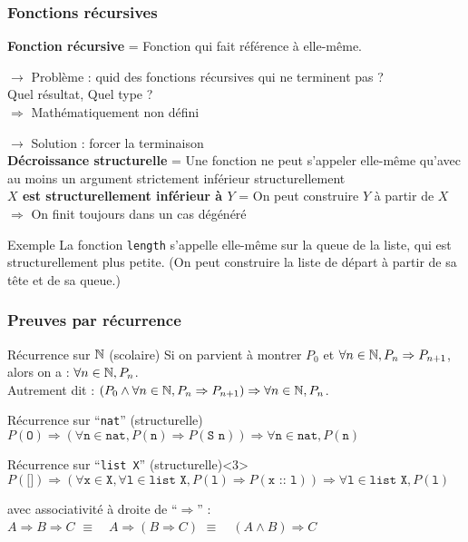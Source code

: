 \documentclass[9pt]{beamer}
\newenvironment{ex}[1][Exemple]{\begin{exampleblock}{#1}}{\end{exampleblock}}
\newenvironment{code}[1][Code]{\begin{block}{#1}}{\end{block}}
\newcommand{\defi}[1]{\textbf{#1}}
\begin{document}
\begin{frame}
\frametitle{Fonctions récursives}

\defi{Fonction récursive} = Fonction qui fait référence à elle-même.

\medskip
$\rightarrow$ Problème : quid des fonctions récursives qui ne terminent pas ?\\
Quel résultat, Quel type ?\\
\quad$\Rightarrow$ Mathématiquement non défini

\pause
\medskip
$\rightarrow$ Solution : forcer la terminaison\\
\defi{Décroissance structurelle} = Une fonction ne peut s'appeler elle-même qu'avec au moins un argument strictement inférieur structurellement\\
\defi{$X$ est structurellement inférieur à $Y$} = On peut construire $Y$ à partir de $X$\\
\quad$\Rightarrow$ On finit toujours dans un cas dégénéré

\pause
\begin{ex}
La fonction \texttt{length} s'appelle elle-même sur la queue de la liste, qui est structurellement plus petite. (On peut construire la liste de départ à partir de sa tête et de sa queue.)
\end{ex}


\end{frame}



\begin{frame}
\frametitle{Preuves par récurrence}

\begin{ex}[Récurrence sur $\mathbb{N}$ (scolaire)]
Si on parvient à montrer $P_0$ et $\forall n \in \mathbb{N}, P_n \Rightarrow P_{n+1}$, alors on a : $\forall n \in \mathbb{N}, P_n$.
\\Autrement dit : 
$(P_0 \wedge \forall n \in \mathbb{N}, P_n \Rightarrow P_{n+1}) \Rightarrow \forall n \in \mathbb{N}, P_n$.
\end{ex}

\pause
\begin{code}[Récurrence sur “\texttt{nat}” (structurelle)]
$P(\texttt{O}) \Rightarrow
  (\forall \texttt{n} \in \texttt{nat}, P(\texttt{n}) \Rightarrow P(\texttt{S n})) \Rightarrow
  \forall \texttt{n} \in \texttt{nat}, P(\texttt{n})$
\end{code}

\begin{code}[Récurrence sur “\texttt{list X}” (structurelle)]<3>
$P(\texttt{[]}) \Rightarrow
  (\forall \texttt{x} \in \texttt{X}, \forall \texttt{l} \in \texttt{list X}, P(\texttt{l}) \Rightarrow P(\texttt{x :: l})) \Rightarrow
  \forall \texttt{l} \in \texttt{list X}, P(\texttt{l})$
\end{code}

avec associativité à droite de “$\Rightarrow$” :
\\\quad$A \Rightarrow B \Rightarrow C$
\quad$\equiv\quad A \Rightarrow (B \Rightarrow C)$
\quad$\equiv\quad (A \wedge B) \Rightarrow C$
\end{frame}
\end{document}

